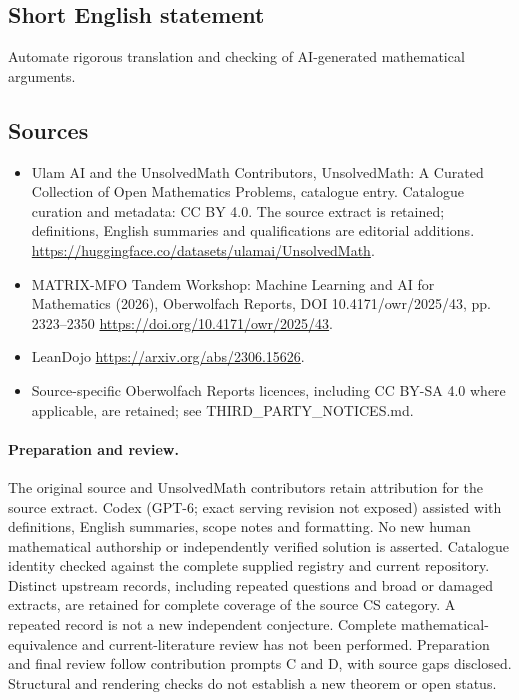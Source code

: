 \documentclass[11pt]{article}
\begin{document}
\subsection{Short English statement}
Automate rigorous translation and checking of AI-generated mathematical arguments.
\subsection{Sources}
\begin{itemize}
\item[\hypertarget{source:statement:1}{S1}] Ulam AI and the UnsolvedMath Contributors, UnsolvedMath: A Curated Collection of Open Mathematics Problems, catalogue entry. Catalogue curation and metadata: CC BY 4.0. The source extract is retained; definitions, English summaries and qualifications are editorial additions.
\url{https://huggingface.co/datasets/ulamai/UnsolvedMath}.
\item[\hypertarget{source:statement:2}{S2}] MATRIX-MFO Tandem Workshop: Machine Learning and AI for Mathematics (2026), Oberwolfach Reports, DOI 10.4171/owr/2025/43, pp. 2323--2350
\url{https://doi.org/10.4171/owr/2025/43}.
\item[\hypertarget{source:statement:3}{S3}] LeanDojo
\url{https://arxiv.org/abs/2306.15626}.
\item Source-specific Oberwolfach Reports licences, including CC BY-SA 4.0 where applicable, are retained; see THIRD\_PARTY\_NOTICES.md.
\end{itemize}
\paragraph{Preparation and review.}
The original source and UnsolvedMath contributors retain attribution for the source extract. Codex (GPT-6; exact serving revision not exposed) assisted with definitions, English summaries, scope notes and formatting. No new human mathematical authorship or independently verified solution is asserted. Catalogue identity checked against the complete supplied registry and current repository. Distinct upstream records, including repeated questions and broad or damaged extracts, are retained for complete coverage of the source CS category. A repeated record is not a new independent conjecture. Complete mathematical-equivalence and current-literature review has not been performed. Preparation and final review follow contribution prompts C and D, with source gaps disclosed. Structural and rendering checks do not establish a new theorem or open status.
\label{end:statement}
\end{document}
